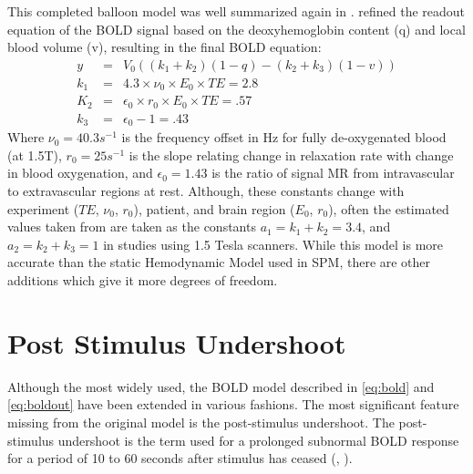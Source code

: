 This completed balloon model was well summarized again
in \cite{Riera2003}.  \cite{Obata2004} refined the readout equation 
of the BOLD signal based on the
deoxyhemoglobin content (q) and local blood volume (v), resulting in the
final BOLD equation:
\begin{eqnarray}
y   &=& V_0((k_1 + k_2)(1-q) - (k_2 + k_3)(1-v))\\
k_1 &=& 4.3 \times \nu_0 \times E_0 \times TE = 2.8\\
K_2 &=& \epsilon_0 \times r_0 \times E_0 \times TE = .57\\
k_3 &=& \epsilon_0 - 1 = .43
\label{eq:boldout}
\end{eqnarray}
Where $\nu_0 = 40.3 s^{-1}$  is the frequency offset in Hz for fully
de-oxygenated blood (at 1.5T), $r_0 = 25 s^{-1}$  is the slope relating
change in relaxation rate with change in blood oxygenation, and
$\epsilon_0 = 1.43$ is the 
ratio of signal MR from intravascular to extravascular regions at rest. Although,
these constants change with experiment ($TE$, $\nu_0$, $r_0$),
patient, and brain 
region ($E_0$, $r_0$), often the estimated values taken from \cite{Obata2004} are 
taken as the constants $a_1 = k_1 + k_2 = 3.4$, and $a_2 = k_2+k_3 = 1$ in 
studies using 1.5 Tesla scanners.
While this model is more accurate than the static Hemodynamic Model used in SPM,
there are other additions which give it more degrees of freedom. 

\section{Post Stimulus Undershoot}
\label{sec:Post Stimulus Undershoot}
Although the most widely used, the BOLD model described in \autoref{eq:bold}
and \autoref{eq:boldout} have been extended in various fashions. The most
significant feature missing from the original model is the 
post-stimulus undershoot.
The post-stimulus undershoot is the term used for a prolonged subnormal
BOLD response for a period of 10 to 60 seconds after stimulus has
ceased (\cite{Chen2009}, \cite{Mandeville1999a}).

